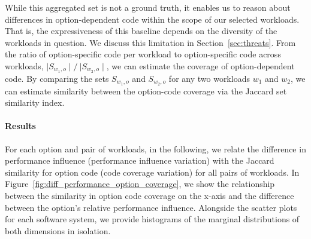While this aggregated set is not a ground truth, it enables us to reason about differences in option-dependent code within the scope of our selected workloads. That is, the expressiveness of this baseline depends on the diversity of the workloads in question. We discuss this limitation in Section~\ref{sec:threats}. From the ratio of option-specific code per workload to option-specific code across workloads, $\mid S_{w_1, o}\mid/~{\mid S_{w_2, o}\mid}$, we can estimate the coverage of option-dependent code. By comparing the sets $S_{w_1, o}$ and $S_{w_2, o}$ for any two workloads $w_1$ and $w_2$, we can estimate similarity between the option-code coverage via the Jaccard set similarity index. 



\paragraph*{Results}
For each option and pair of workloads, in the following, we relate the difference in performance influence (performance influence variation) with the Jaccard similarity for option code (code coverage variation) for all pairs of workloads.
In Figure~\ref{fig:diff_performance_option_coverage}, we show the relationship between the similarity in option code coverage on the x-axis and the difference between the option's relative performance influence. Alongside the scatter plots for each software system, we provide histograms of the marginal distributions of both dimensions in isolation. 

